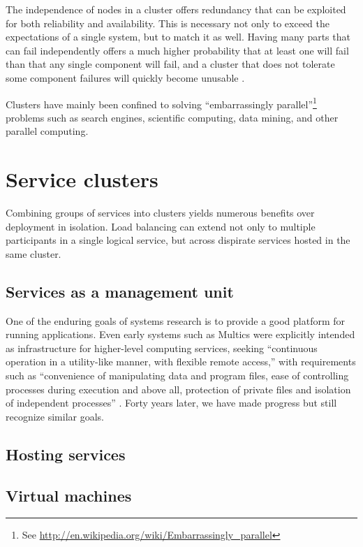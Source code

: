 The independence of nodes in a cluster offers redundancy that can be exploited for both reliability and availability. This is necessary not only to exceed the expectations of a single system, but to match it as well. Having many parts that can fail independently offers a much higher probability that at least one will fail than that any single component will fail, and a cluster that does not tolerate some component failures will quickly become unusable \cite{birrell93}.

Clusters have mainly been confined to solving ``embarrassingly parallel''\footnote{See \url{http://en.wikipedia.org/wiki/Embarrassingly_parallel}} problems such as search engines, scientific computing, data mining, and other parallel computing.


\section{Service clusters}

Combining groups of services into clusters yields numerous benefits over deployment in isolation. Load balancing can extend not only to multiple participants in a single logical service, but across dispirate services hosted in the same cluster.

\subsection{Services as a management unit}

One of the enduring goals of systems research is to provide a good platform for running applications. Even early systems such as Multics were explicitly intended as infrastructure for higher-level computing services, seeking ``continuous operation in a utility-like manner, with flexible remote access,'' with requirements such as ``convenience of manipulating data and program files, ease of controlling processes during execution and above all, protection of private files and isolation of independent processes'' \cite{corbato}. Forty years later, we have made progress but still recognize similar goals.

\subsection{Hosting services}

\subsection{Virtual machines}

